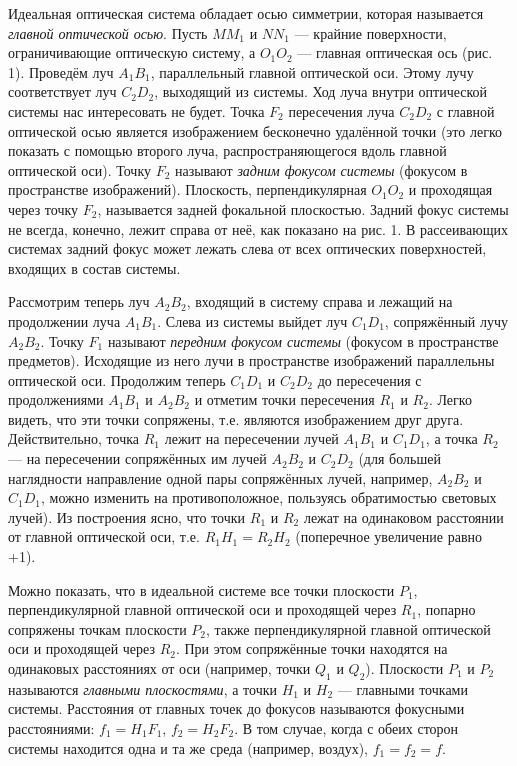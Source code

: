 \documentclass[14pt]{article}
\begin{document}
Идеальная оптическая система обладает осью симметрии, которая
называется \textsl{главной оптической осью}. Пусть $MM_1$ и $NN_1$ — крайние
поверхности, ограничивающие оптическую систему, а $O_1O_2$ — главная
оптическая ось (рис. 1). Проведём луч $A_1B_1$, параллельный главной оптической
оси. Этому лучу соответствует луч $C_2D_2$, выходящий из системы.
Ход луча внутри оптической системы нас интересовать не будет.
Точка $F_2$ пересечения луча $C_2D_2$ с главной оптической осью является
изображением бесконечно удалённой точки (это легко показать с помощью
второго луча, распространяющегося вдоль главной оптической
оси). Точку $F_2$ называют \textsl{задним фокусом системы} (фокусом в пространстве
изображений). Плоскость, перпендикулярная $O_1O_2$ и проходящая
через точку $F_2$, называется задней фокальной плоскостью. Задний фокус системы не всегда,
конечно, лежит справа от неё,
как показано на
рис. 1.
В рассеивающих системах задний фокус может лежать слева от
всех оптических поверхностей, входящих в состав системы.

Рассмотрим теперь луч $A_2B_2$,
входящий в систему справа
и
лежащий на продолжении луча
$A_1B_1$. Слева из системы выйдет луч
$C_1D_1$, сопряжённый лучу $A_2B_2$. Точку
$F_1$ называют \textsl{передним фокусом системы} (фокусом
в пространстве предметов).
Исходящие из него лучи
в пространстве изображений параллельны
оптической оси. Продолжим
теперь $C_1D_1$ и $C_2D_2$ до пересечения с продолжениями
$A_1B_1$ и $A_2B_2$ и отметим точки пересечения $R_1$ и
$R_2$. Легко видеть, что эти точки
сопряжены, т.е. являются изображением друг друга. Действительно,
точка
$R_1$ лежит на пересечении лучей
$A_1B_1$ и
$C_1D_1$, а точка $R_2$ — на
пересечении сопряжённых им лучей
$A_2B_2$ и
$C_2D_2$ (для большей наглядности
направление одной пары сопряжённых лучей, например,
$A_2B_2$
и
$C_1D_1$, можно изменить на противоположное, пользуясь обратимостью
световых лучей). Из построения ясно, что точки
$R_1$ и
$R_2$ лежат на одинаковом
расстоянии от главной оптической оси, т.е.
$R_1H_1 = R_2H_2$ (поперечное
увеличение равно +1).


Можно показать, что в идеальной системе все точки плоскости
$P_1$,
перпендикулярной главной оптической оси
и проходящей через
$R_1$, попарно
сопряжены точкам плоскости
$P_2$, также перпендикулярной главной
оптической оси
и проходящей через
$R_2$. При этом сопряжённые точки
находятся на одинаковых расстояниях от оси (например, точки
$Q_1$ и $Q_2$). Плоскости
$P_1$ и
$P_2$ называются \textsl{главными плоскостями}, а точки $H_1$ и
$H_2$ — главными точками системы.
Расстояния от главных точек до фокусов называются фокусными
расстояниями: 
$f_1 = H_1F_1$, $f_2 = H_2F_2$. В том случае,
когда с обеих сторон системы находится одна и
та же среда (например, воздух),
$f_1 = f_2 = f$.
\end{document}
